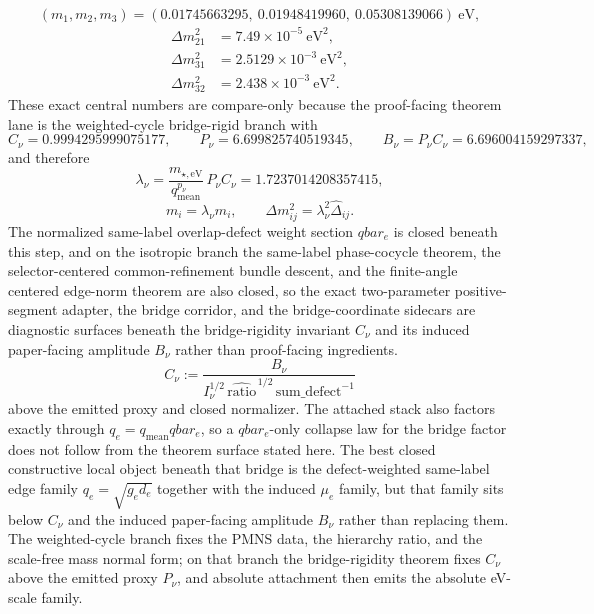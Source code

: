 \documentclass[11pt]{article}
\begin{document}
\[
(m_1,m_2,m_3)=(0.01745663295,\ 0.01948419960,\ 0.05308139066)\ \mathrm{eV},
\]
\[
\begin{aligned}
\Delta m_{21}^2&=7.49\times10^{-5}\ \mathrm{eV}^2,\\
\Delta m_{31}^2&=2.5129\times10^{-3}\ \mathrm{eV}^2,\\
\Delta m_{32}^2&=2.438\times10^{-3}\ \mathrm{eV}^2.
\end{aligned}
\]
These exact central numbers are compare-only because the proof-facing theorem lane is the weighted-cycle bridge-rigid branch with
\[
C_\nu=0.9994295999075177,\qquad
P_\nu=6.699825740519345,\qquad
B_\nu=P_\nu C_\nu=6.696004159297337,
\]
and therefore
\[
\lambda_\nu=\frac{m_{\star,\mathrm{eV}}}{q_{\mathrm{mean}}^{p_\nu}}\,P_\nu C_\nu=1.7237014208357415,
\]
\[
m_i=\lambda_\nu \widehat m_i,
\qquad
\Delta m_{ij}^2=\lambda_\nu^2 \widehat{\Delta}_{ij}.
\]
The normalized same-label overlap-defect weight section \(qbar_e\) is closed beneath
this step, and on the isotropic branch the same-label phase-cocycle theorem, the
selector-centered common-refinement bundle descent, and the finite-angle centered edge-norm
theorem are also closed, so the exact two-parameter positive-segment adapter, the bridge corridor, and the bridge-coordinate sidecars are diagnostic surfaces beneath the bridge-rigidity invariant \(C_\nu\) and its induced paper-facing amplitude \(B_\nu\) rather than proof-facing ingredients.
\[
C_\nu:=\frac{B_\nu}{I_\nu^{1/2}\,\widehat{\mathrm{ratio}}^{\,1/2}\,\mathrm{sum\_defect}^{-1}}
\]
above the emitted proxy and closed normalizer. The attached stack also factors exactly through
\(q_e = q_{\mathrm{mean}} qbar_e\), so a \(qbar_e\)-only collapse law for the bridge factor does
not follow from the theorem surface stated here. The best closed constructive local object beneath that bridge is the
defect-weighted same-label edge family \(q_e=\sqrt{g_e d_e}\) together with the induced
\(\mu_e\) family, but that family sits below \(C_\nu\) and the induced paper-facing amplitude \(B_\nu\) rather than replacing them.
The weighted-cycle branch fixes the PMNS data, the hierarchy ratio, and the
scale-free mass normal form; on that branch the bridge-rigidity theorem fixes
\(C_\nu\) above the emitted proxy \(P_\nu\), and absolute attachment then emits the
absolute eV-scale family.
\end{document}
